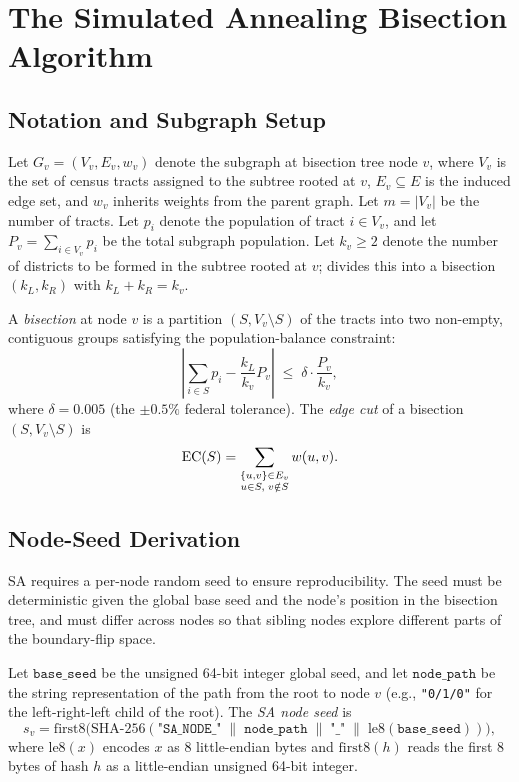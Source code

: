 \section{The Simulated Annealing Bisection Algorithm}
\label{sec:algorithm}

\subsection{Notation and Subgraph Setup}

Let $G_v = (V_v, E_v, w_v)$ denote the subgraph at bisection tree node $v$,
where $V_v$ is the set of census tracts assigned to the subtree rooted at $v$,
$E_v \subseteq E$ is the induced edge set, and $w_v$ inherits weights from the
parent graph.
Let $m = |V_v|$ be the number of tracts.
Let $p_i$ denote the population of tract $i \in V_v$, and let
$P_v = \sum_{i \in V_v} p_i$ be the total subgraph population.
Let $k_v \ge 2$ denote the number of districts to be formed in the subtree
rooted at $v$; \sa{} divides this into a bisection $(k_L, k_R)$ with
$k_L + k_R = k_v$.

A \emph{bisection} at node $v$ is a partition $(S, V_v \setminus S)$ of the
tracts into two non-empty, contiguous groups satisfying the population-balance
constraint:
\[
  \left|\sum_{i \in S} p_i - \frac{k_L}{k_v} P_v \right|
  \;\le\;
  \delta \cdot \frac{P_v}{k_v},
\]
where $\delta = 0.005$ (the $\pm 0.5\%$ federal tolerance).
The \emph{edge cut} of a bisection $(S, V_v \setminus S)$ is
\[
  \mathrm{EC}(S) = \sum_{\substack{\{u,v\} \in E_v \\ u \in S,\; v \notin S}} w(u,v).
\]

\subsection{Node-Seed Derivation}

SA requires a per-node random seed to ensure reproducibility.
The seed must be deterministic given the global base seed and the node's
position in the bisection tree, and must differ across nodes so that
sibling nodes explore different parts of the boundary-flip space.

\begin{definition}
\label{def:sa-seed}
Let $\mathtt{base\_seed}$ be the unsigned 64-bit integer global seed, and let
$\mathtt{node\_path}$ be the string representation of the path from the root
to node $v$ (e.g., \texttt{"0/1/0"} for the left-right-left child of the root).
The \emph{SA node seed} is
\[
  s_v = \mathrm{first8}\bigl(
    \mathrm{SHA\text{-}256}(
      \texttt{"SA\_NODE\_"} \;\|\; \mathtt{node\_path}
      \;\|\; \texttt{"\_"} \;\|\; \mathrm{le8}(\mathtt{base\_seed})
    )
  \bigr),
\]
where $\mathrm{le8}(x)$ encodes $x$ as 8 little-endian bytes and
$\mathrm{first8}(h)$ reads the first 8 bytes of hash $h$ as a little-endian
unsigned 64-bit integer.
\end{definition}

